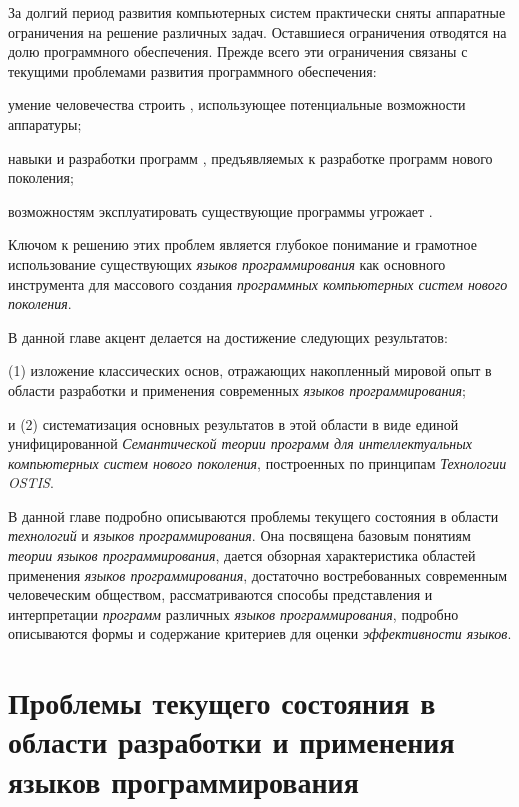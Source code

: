 За долгий период развития компьютерных систем практически сняты аппаратные ограничения на решение различных задач. Оставшиеся ограничения отводятся на долю программного обеспечения. Прежде всего эти ограничения связаны с текущими проблемами развития программного обеспечения:
\begin{textitemize}
    \item {} умение человечества строить , использующее потенциальные возможности аппаратуры;
    \item навыки и  разработки программ , предъявляемых к разработке программ нового поколения;
    \item возможностям эксплуатировать существующие программы угрожает .
\end{textitemize}

Ключом к решению этих проблем является глубокое понимание и грамотное использование существующих \textit{языков программирования} как основного инструмента для массового создания \textit{программных компьютерных систем нового поколения}.

В данной главе акцент делается на достижение следующих результатов:
\begin{textitemize}
    \item (1) изложение классических основ, отражающих накопленный мировой опыт в области разработки и применения современных \textit{языков программирования};
    \item и (2) систематизация основных результатов в этой области в виде единой унифицированной \textit{Семантической теории программ для интеллектуальных компьютерных систем нового поколения}, построенных по принципам \textit{Технологии OSTIS}.
\end{textitemize}

В данной главе подробно описываются проблемы текущего состояния в области \textit{технологий} и \textit{языков программирования}. Она посвящена базовым понятиям \textit{теории языков программирования}, дается обзорная характеристика областей применения \textit{языков программирования}, достаточно востребованных современным человеческим обществом, рассматриваются способы представления и интерпретации \textit{программ} различных \textit{языков программирования}, подробно описываются формы и содержание критериев для оценки \textit{эффективности языков}.

\section{Проблемы текущего состояния в области разработки и применения языков программирования}
\label{sec_programs_problems_and_tasks}

